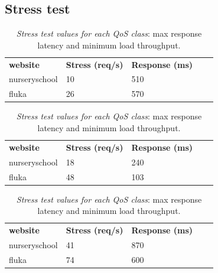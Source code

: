 \subsection{Stress test}

\begin{table}
    \centering
    \begin{subtable}{0.5\textwidth}
        \begin{tabular}{|l|ll|ll}
        \cline{1-3}
        \textbf{website} & \multicolumn{1}{l|}{\textbf{Stress (req/s)}} & \textbf{Response (ms)} &  &  \\ \cline{1-3}
        nurseryschool    & 10                                           & 510                    &  &  \\ \cline{1-1}
        fluka            & 26                                           & 570                    &  &  \\ \cline{1-3}
        \end{tabular}
    \caption{Test}
    \end{subtable}
    \begin{subtable}{0.5\textwidth}
        \begin{tabular}{|l|ll|ll}
        \cline{1-3}
        \textbf{website} & \multicolumn{1}{l|}{\textbf{Stress (req/s)}} & \textbf{Response (ms)} &  &  \\ \cline{1-3}
        nurseryschool    & 18                                           & 240                    &  &  \\ \cline{1-1}
        fluka            & 48                                           & 103                    &  &  \\ \cline{1-3}
        \end{tabular}
    \caption{Standard}
    \end{subtable}
    \begin{subtable}{0.5\textwidth}
        \begin{tabular}{|l|ll|ll}
        \cline{1-3}
        \textbf{website} & \multicolumn{1}{l|}{\textbf{Stress (req/s)}} & \textbf{Response (ms)} &  &  \\ \cline{1-3}
        nurseryschool    & 41  & 870   &  &  \\ \cline{1-1}
        fluka            & 74  & 600   &  &  \\ \cline{1-3}
        \end{tabular}
    \caption{Critical}
    \end{subtable}
    \vspace{-1.5em}
    \caption{\emph{Stress test values for each QoS class}: max response latency and minimum load throughput.}
    \vspace{-2.2em}
    \label{tab:stress-response}
\end{table}

